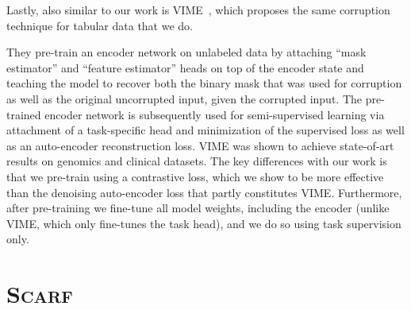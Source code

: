 Lastly, also similar to our work is VIME~\citep{yoon2020vime}, which proposes the same corruption technique for tabular data that we do.

They pre-train an encoder network on unlabeled data by attaching ``mask estimator'' and ``feature estimator'' heads on top of the encoder state and teaching the model to recover both the binary mask that was used for corruption as well as the original uncorrupted input, given the corrupted input. The pre-trained encoder network is subsequently used for semi-supervised learning via attachment of a task-specific head and minimization of the supervised loss as well as an auto-encoder reconstruction loss. VIME was shown to achieve state-of-art results on genomics and clinical datasets. The key differences with our work is that we pre-train using a contrastive loss, which we show to be more effective than the denoising auto-encoder loss that partly constitutes VIME. Furthermore, after pre-training we fine-tune all model weights, including the encoder (unlike VIME, which only fine-tunes the task head), and we do so using task supervision only. 

\section{\textsc{Scarf}}

